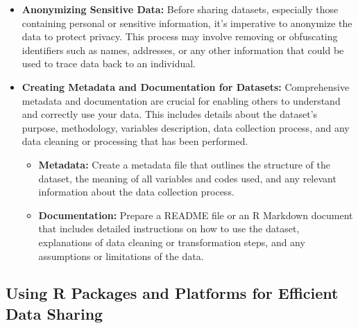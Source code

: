 \documentclass[
]{book}
\newenvironment{Shaded}{\begin{snugshade}}{\end{snugshade}}
\newcommand{\CommentTok}[1]{\textcolor[rgb]{0.56,0.35,0.01}{\textit{#1}}}
\newcommand{\ConstantTok}[1]{\textcolor[rgb]{0.56,0.35,0.01}{#1}}
\newcommand{\NormalTok}[1]{#1}
\newcommand{\OtherTok}[1]{\textcolor[rgb]{0.56,0.35,0.01}{#1}}
\newcommand{\SpecialCharTok}[1]{\textcolor[rgb]{0.81,0.36,0.00}{\textbf{#1}}}
\providecommand{\tightlist}{%
  \setlength{\itemsep}{0pt}\setlength{\parskip}{0pt}}
\begin{document}
\begin{itemize}
\tightlist
\item
  \textbf{Anonymizing Sensitive Data:} Before sharing datasets, especially those containing personal or sensitive information, it's imperative to anonymize the data to protect privacy. This process may involve removing or obfuscating identifiers such as names, addresses, or any other information that could be used to trace data back to an individual.
\end{itemize}

\begin{Shaded}
\end{Shaded}

\begin{itemize}
\item
  \textbf{Creating Metadata and Documentation for Datasets:} Comprehensive metadata and documentation are crucial for enabling others to understand and correctly use your data. This includes details about the dataset's purpose, methodology, variables description, data collection process, and any data cleaning or processing that has been performed.

  \begin{itemize}
  \item
    \textbf{Metadata:} Create a metadata file that outlines the structure of the dataset, the meaning of all variables and codes used, and any relevant information about the data collection process.
  \item
    \textbf{Documentation:} Prepare a README file or an R Markdown document that includes detailed instructions on how to use the dataset, explanations of data cleaning or transformation steps, and any assumptions or limitations of the data.
  \end{itemize}
\end{itemize}

\hypertarget{using-r-packages-and-platforms-for-efficient-data-sharing}{%
\subsection*{Using R Packages and Platforms for Efficient Data Sharing}\label{using-r-packages-and-platforms-for-efficient-data-sharing}}
\end{document}
